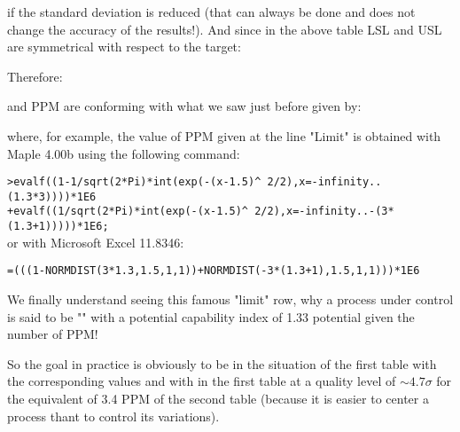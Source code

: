 \begin{enumerate}
	if the standard deviation is reduced (that can always be done and does not change the accuracy of the results!). And since in the above table LSL and USL are symmetrical with respect to the target:
	
	Therefore:
	
	and PPM are conforming with what we saw just before given by:
	
where, for example, the value of PPM given at the line "Limit" is obtained with Maple 4.00b using the following command:

	\texttt{>evalf((1-1/sqrt(2*Pi)*int(exp(-(x-1.5)\string^ 2/2),x=-infinity..(1.3*3))))*1E6}\\
	\texttt{+evalf((1/sqrt(2*Pi)*int(exp(-(x-1.5)\string^ 2/2),x=-infinity..-(3*(1.3+1)))))*1E6;}\\
	
	or with Microsoft Excel 11.8346:
\begin{center}
	\texttt{=(((1-NORMDIST(3*1.3,1.5,1,1))+NORMDIST(-3*(1.3+1),1.5,1,1)))*1E6}
\end{center}
	\end{enumerate}	
	
	We finally understand seeing this famous "limit" row, why a process under control is said to be "" with a potential capability index of 1.33 potential given the number of PPM!
	
	So the goal in practice is obviously to be in the situation of the first table with the corresponding values and with in the first table at a quality level of $\sim4.7\sigma$ for the equivalent of 3.4 PPM of the second table (because it is easier to center a process thant to control its variations).
	
